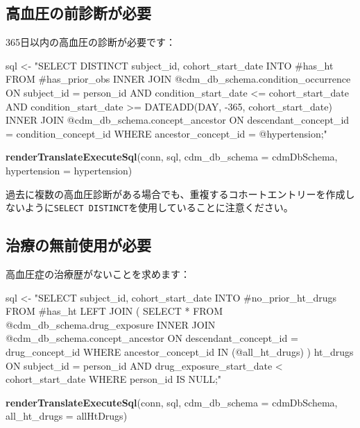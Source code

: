 \documentclass[
  11pt]{book}
\newenvironment{Shaded}{\begin{snugshade}}{\end{snugshade}}
\newcommand{\AttributeTok}[1]{\textcolor[rgb]{0.13,0.29,0.53}{#1}}
\newcommand{\FunctionTok}[1]{\textcolor[rgb]{0.13,0.29,0.53}{\textbf{#1}}}
\newcommand{\NormalTok}[1]{#1}
\newcommand{\OtherTok}[1]{\textcolor[rgb]{0.56,0.35,0.01}{#1}}
\newcommand{\StringTok}[1]{\textcolor[rgb]{0.31,0.60,0.02}{#1}}
\theoremstyle{definition}
\theoremstyle{definition}
\theoremstyle{definition}
\theoremstyle{definition}
\theoremstyle{remark}
\begin{document}
\subsection{高血圧の前診断が必要}\label{ux9ad8ux8840ux5727ux306eux524dux8a3aux65adux304cux5fc5ux8981}

365日以内の高血圧の診断が必要です：

\begin{Shaded}
\begin{Highlighting}[]
\NormalTok{sql }\OtherTok{\textless{}{-}} \StringTok{"SELECT DISTINCT subject\_id,}
\StringTok{  cohort\_start\_date}
\StringTok{INTO \#has\_ht}
\StringTok{FROM \#has\_prior\_obs}
\StringTok{INNER JOIN @cdm\_db\_schema.condition\_occurrence}
\StringTok{  ON subject\_id = person\_id}
\StringTok{    AND condition\_start\_date \textless{}= cohort\_start\_date}
\StringTok{    AND condition\_start\_date \textgreater{}= DATEADD(DAY, {-}365, cohort\_start\_date)}
\StringTok{INNER JOIN @cdm\_db\_schema.concept\_ancestor}
\StringTok{  ON descendant\_concept\_id = condition\_concept\_id}
\StringTok{WHERE ancestor\_concept\_id = @hypertension;"}

\FunctionTok{renderTranslateExecuteSql}\NormalTok{(conn,}
\NormalTok{                          sql,}
                          \AttributeTok{cdm\_db\_schema =}\NormalTok{ cdmDbSchema,}
                          \AttributeTok{hypertension =}\NormalTok{ hypertension)}
\end{Highlighting}
\end{Shaded}

過去に複数の高血圧診断がある場合でも、重複するコホートエントリーを作成しないように\texttt{SELECT\ DISTINCT}を使用していることに注意ください。

\subsection{治療の無前使用が必要}\label{ux6cbbux7642ux306eux7121ux524dux4f7fux7528ux304cux5fc5ux8981}

高血圧症の治療歴がないことを求めます：

\begin{Shaded}
\begin{Highlighting}[]
\NormalTok{sql }\OtherTok{\textless{}{-}} \StringTok{"SELECT subject\_id,}
\StringTok{  cohort\_start\_date}
\StringTok{INTO \#no\_prior\_ht\_drugs}
\StringTok{FROM \#has\_ht}
\StringTok{LEFT JOIN (}
\StringTok{  SELECT *}
\StringTok{  FROM @cdm\_db\_schema.drug\_exposure}
\StringTok{  INNER JOIN @cdm\_db\_schema.concept\_ancestor}
\StringTok{    ON descendant\_concept\_id = drug\_concept\_id}
\StringTok{  WHERE ancestor\_concept\_id IN (@all\_ht\_drugs)}
\StringTok{) ht\_drugs}
\StringTok{  ON subject\_id = person\_id}
\StringTok{    AND drug\_exposure\_start\_date \textless{} cohort\_start\_date}
\StringTok{WHERE person\_id IS NULL;"}

\FunctionTok{renderTranslateExecuteSql}\NormalTok{(conn,}
\NormalTok{                          sql,}
                          \AttributeTok{cdm\_db\_schema =}\NormalTok{ cdmDbSchema,}
                          \AttributeTok{all\_ht\_drugs =}\NormalTok{ allHtDrugs)}
\end{Highlighting}
\end{Shaded}
\end{document}
